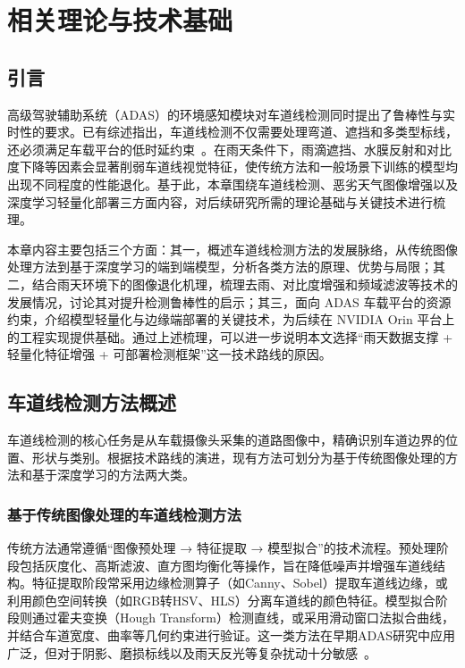 \chapter{相关理论与技术基础}
\label{cha:related_theory}

\section{引言}
\label{sec:intro_2}
高级驾驶辅助系统（ADAS）的环境感知模块对车道线检测同时提出了鲁棒性与实时性的要求。已有综述指出，车道线检测不仅需要处理弯道、遮挡和多类型标线，还必须满足车载平台的低时延约束~\cite{barhillel2014survey,cao2019lane}。在雨天条件下，雨滴遮挡、水膜反射和对比度下降等因素会显著削弱车道线视觉特征，使传统方法和一般场景下训练的模型均出现不同程度的性能退化。基于此，本章围绕车道线检测、恶劣天气图像增强以及深度学习轻量化部署三方面内容，对后续研究所需的理论基础与关键技术进行梳理。

本章内容主要包括三个方面：其一，概述车道线检测方法的发展脉络，从传统图像处理方法到基于深度学习的端到端模型，分析各类方法的原理、优势与局限；其二，结合雨天环境下的图像退化机理，梳理去雨、对比度增强和频域滤波等技术的发展情况，讨论其对提升检测鲁棒性的启示；其三，面向 ADAS 车载平台的资源约束，介绍模型轻量化与边缘端部署的关键技术，为后续在 NVIDIA Orin 平台上的工程实现提供基础。通过上述梳理，可以进一步说明本文选择“雨天数据支撑 + 轻量化特征增强 + 可部署检测框架”这一技术路线的原因。

\section{车道线检测方法概述}
\label{sec:lane_detection_overview}
车道线检测的核心任务是从车载摄像头采集的道路图像中，精确识别车道边界的位置、形状与类别。根据技术路线的演进，现有方法可划分为基于传统图像处理的方法和基于深度学习的方法两大类。

\subsection{基于传统图像处理的车道线检测方法}
传统方法通常遵循“图像预处理 → 特征提取 → 模型拟合”的技术流程。预处理阶段包括灰度化、高斯滤波、直方图均衡化等操作，旨在降低噪声并增强车道线结构。特征提取阶段常采用边缘检测算子（如Canny、Sobel）提取车道线边缘，或利用颜色空间转换（如RGB转HSV、HLS）分离车道线的颜色特征。模型拟合阶段则通过霍夫变换（Hough Transform）检测直线，或采用滑动窗口法拟合曲线，并结合车道宽度、曲率等几何约束进行验证。这一类方法在早期ADAS研究中应用广泛，但对于阴影、磨损标线以及雨天反光等复杂扰动十分敏感~\cite{barhillel2014survey,cao2019lane}。

